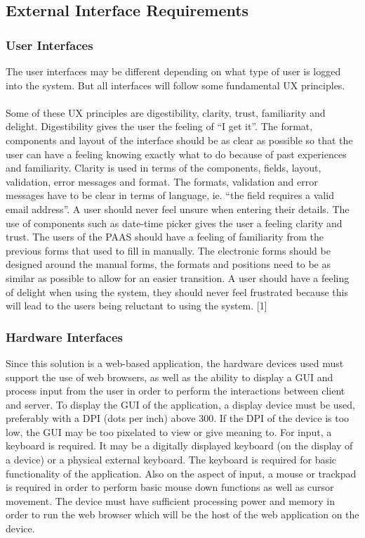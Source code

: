 \documentclass{article}
\begin{document}
\subsection{External Interface Requirements}
\subsubsection{User Interfaces}
The user interfaces may be different depending on what type of user is logged into the system. But all interfaces will follow some fundamental UX principles. \\ \\
Some of these UX principles are digestibility, clarity, trust, familiarity and delight. Digestibility gives the user the feeling of “I get it”. The format, components and layout of the interface should be as clear as possible so that the user can have a feeling knowing exactly what to do because of past experiences and familiarity. Clarity is used in terms of the components, fields, layout, validation, error messages and format. The formats, validation and error messages have to be clear in terms of language, ie. “the field requires a valid email address”. A user should never feel unsure when entering their details. The use of components such as date-time picker gives the user a feeling clarity and trust. The users of the PAAS should have a feeling of familiarity from the previous forms that used to fill in manually. The electronic forms should be designed around the manual forms, the formats and positions need to be as similar as possible to allow for an easier transition. A user should have a feeling of delight when using the system, they should never feel frustrated because this will lead to the users being reluctant to using the system. [1]

\subsubsection{Hardware Interfaces}
Since this solution is a web-based application, the hardware devices used must support the use of web browsers, as well as the ability to display a GUI and process input from the user in order to perform the interactions between client and server. To display the GUI of the application, a display device must be used, preferably with a DPI (dots per inch) above 300. If the DPI of the device is too low, the GUI may be too pixelated to view or give meaning to. For input, a keyboard is required. It may be a digitally displayed keyboard (on the display of a device) or a physical external keyboard. The keyboard is required for basic functionality of the application. Also on the aspect of input, a mouse or trackpad is required in order to perform basic mouse down functions as well as cursor movement. The device must have sufficient processing power and memory in order to run the web browser which will be the host of the web application on the device. 
\end{document}
